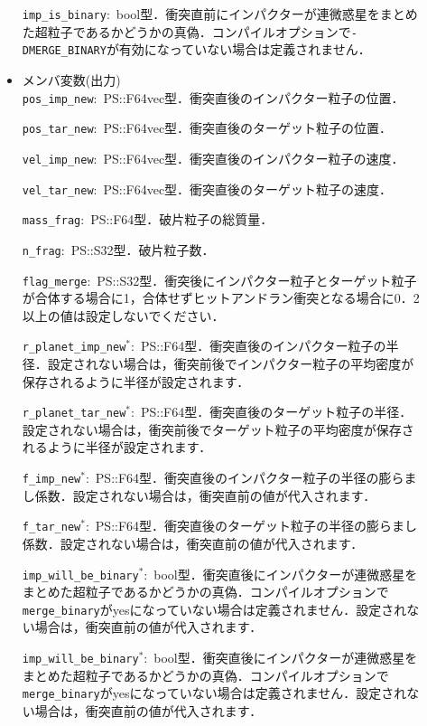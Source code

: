 \documentclass[12pt,a4paper,dvipdfmx]{jsarticle}
\begin{document}
\begin{description}
\begin{itemize}
\texttt{imp\_is\_binary}:\ bool型．衝突直前にインパクターが連微惑星をまとめた超粒子であるかどうかの真偽．コンパイルオプションで\texttt{-DMERGE\_BINARY}が有効になっていない場合は定義されません．
\\

\item
メンバ変数(出力)\\
\texttt{pos\_imp\_new}:\ PS::F64vec型．衝突直後のインパクター粒子の位置．

\texttt{pos\_tar\_new}:\ PS::F64vec型．衝突直後のターゲット粒子の位置．

\texttt{vel\_imp\_new}:\ PS::F64vec型．衝突直後のインパクター粒子の速度．

\texttt{vel\_tar\_new}:\ PS::F64vec型．衝突直後のターゲット粒子の速度．

\texttt{mass\_frag}:\ PS::F64型．破片粒子の総質量．

\texttt{n\_frag}:\ PS::S32型．破片粒子数．

\texttt{flag\_merge}:\ PS::S32型．衝突後にインパクター粒子とターゲット粒子が合体する場合に1，合体せずヒットアンドラン衝突となる場合に0．2以上の値は設定しないでください．

\texttt{r\_planet\_imp\_new}${}^{*}$:\ PS::F64型．衝突直後のインパクター粒子の半径．設定されない場合は，衝突前後でインパクター粒子の平均密度が保存されるように半径が設定されます．

\texttt{r\_planet\_tar\_new}${}^{*}$:\ PS::F64型．衝突直後のターゲット粒子の半径．設定されない場合は，衝突前後でターゲット粒子の平均密度が保存されるように半径が設定されます．

\texttt{f\_imp\_new}${}^{*}$:\ PS::F64型．衝突直後のインパクター粒子の半径の膨らまし係数．設定されない場合は，衝突直前の値が代入されます．

\texttt{f\_tar\_new}${}^{*}$:\ PS::F64型．衝突直後のターゲット粒子の半径の膨らまし係数．設定されない場合は，衝突直前の値が代入されます．

\texttt{imp\_will\_be\_binary}${}^{*}$:\ bool型．衝突直後にインパクターが連微惑星をまとめた超粒子であるかどうかの真偽．コンパイルオプションで\texttt{merge\_binary}がyesになっていない場合は定義されません．設定されない場合は，衝突直前の値が代入されます．

\texttt{imp\_will\_be\_binary}${}^{*}$:\ bool型．衝突直後にインパクターが連微惑星をまとめた超粒子であるかどうかの真偽．コンパイルオプションで\texttt{merge\_binary}がyesになっていない場合は定義されません．設定されない場合は，衝突直前の値が代入されます．
\\


\end{itemize}
\end{description}
\end{document}

